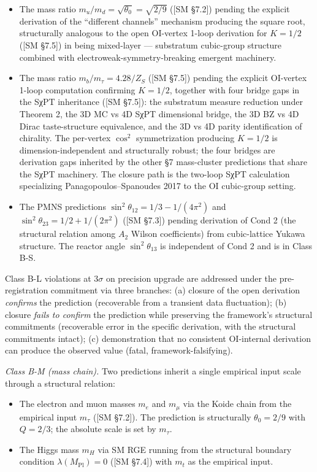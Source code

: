 \documentclass[
]{article}
\providecommand{\tightlist}{%
  \setlength{\itemsep}{0pt}\setlength{\parskip}{0pt}}
\begin{document}
\begin{itemize}
\tightlist
\item
  The mass ratio \(m_u/m_d = \sqrt{\theta_0} = \sqrt{2/9}\) ({[}SM
  §7.2{]}) pending the explicit derivation of the ``different channels''
  mechanism producing the square root, structurally analogous to the
  open OI-vertex 1-loop derivation for \(K = 1/2\) ({[}SM §7.5{]}) in
  being mixed-layer --- substratum cubic-group structure combined with
  electroweak-symmetry-breaking emergent machinery.
\item
  The mass ratio \(m_b/m_\tau = 4.28/Z_S\) ({[}SM §7.5{]}) pending the
  explicit OI-vertex 1-loop computation confirming \(K = 1/2\), together
  with four bridge gaps in the SχPT inheritance ({[}SM §7.5{]}): the
  substratum measure reduction under Theorem 2, the 3D MC vs 4D SχPT
  dimensional bridge, the 3D BZ vs 4D Dirac taste-structure equivalence,
  and the 3D vs 4D parity identification of chirality. The per-vertex
  \(\cos^2\) symmetrization producing \(K = 1/2\) is
  dimension-independent and structurally robust; the four bridges are
  derivation gaps inherited by the other §7 mass-cluster predictions
  that share the SχPT machinery. The closure path is the two-loop SχPT
  calculation specializing Panagopoulos--Spanoudes 2017 to the OI
  cubic-group setting.
\item
  The PMNS predictions \(\sin^2\theta_{12} = 1/3 - 1/(4\pi^2)\) and
  \(\sin^2\theta_{23} = 1/2 + 1/(2\pi^2)\) ({[}SM §7.3{]}) pending
  derivation of Cond 2 (the structural relation among \(A_2\) Wilson
  coefficients) from cubic-lattice Yukawa structure. The reactor angle
  \(\sin^2\theta_{13}\) is independent of Cond 2 and is in Class B-S.
\end{itemize}

Class B-L violations at \(3\sigma\) on precision upgrade are addressed
under the pre-registration commitment via three branches: (a) closure of
the open derivation \emph{confirms} the prediction (recoverable from a
transient data fluctuation); (b) closure \emph{fails to confirm} the
prediction while preserving the framework's structural commitments
(recoverable error in the specific derivation, with the structural
commitments intact); (c) demonstration that no consistent OI-internal
derivation can produce the observed value (fatal, framework-falsifying).

\emph{Class B-M (mass chain).} Two predictions inherit a single
empirical input scale through a structural relation:

\begin{itemize}
\tightlist
\item
  The electron and muon masses \(m_e\) and \(m_\mu\) via the Koide chain
  from the empirical input \(m_\tau\) ({[}SM §7.2{]}). The prediction is
  structurally \(\theta_0 = 2/9\) with \(Q = 2/3\); the absolute scale
  is set by \(m_\tau\).
\item
  The Higgs mass \(m_H\) via SM RGE running from the structural boundary
  condition \(\lambda(M_{\text{Pl}}) = 0\) ({[}SM §7.4{]}) with \(m_t\)
  as the empirical input.
\end{itemize}
\end{document}
